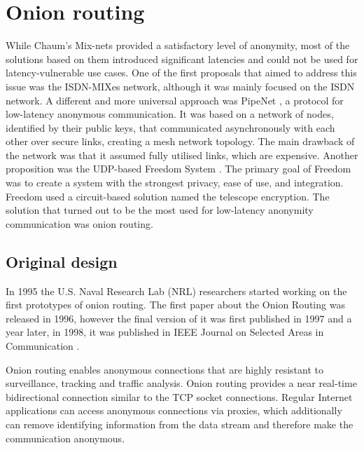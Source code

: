\section{Onion routing}
While Chaum's Mix-nets provided a satisfactory level of anonymity, most of the solutions based on them introduced significant latencies and could not be used for latency-vulnerable use cases. One of the first proposals that aimed to address this issue was the ISDN-MIXes network, although it was mainly focused on the ISDN network. A different and more universal approach was PipeNet \cite{pipenet}, a protocol for low-latency anonymous communication. It was based on a network of nodes, identified by their public keys, that communicated asynchronously with each other over secure links, creating a mesh network topology. The main drawback of the network was that it assumed fully utilised links, which are expensive.
Another proposition was the UDP-based Freedom System \cite{freedom}. The primary goal of Freedom was to create a system with the strongest privacy, ease of use, and integration. Freedom used a circuit-based solution named the telescope encryption.
The solution that turned out to be the most used for low-latency anonymity communication was onion routing.

\subsection{Original design}
In 1995 the U.S. Naval Research Lab (NRL) researchers started working on the first prototypes of onion routing.  The first paper about the Onion Routing was released in 1996, however the final version of it was first published in 1997 and a year later, in 1998, it was published in IEEE Journal on Selected Areas in Communication \cite{onion-routing98}.

Onion routing enables anonymous connections that are highly resistant to surveillance, tracking and traffic analysis. Onion routing provides a near real-time bidirectional connection similar to the TCP socket connections. Regular Internet applications can access anonymous connections via proxies, which additionally can remove identifying information from the data stream and therefore make the communication anonymous.

